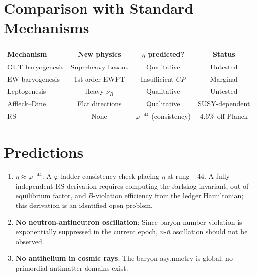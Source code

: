\documentclass[12pt,a4paper]{article}
\theoremstyle{definition}
\theoremstyle{remark}
\begin{document}
\section{Comparison with Standard Mechanisms}
\label{sec:comparison}

\begin{center}
\renewcommand{\arraystretch}{1.3}
\begin{tabular}{@{}lccc@{}}
\toprule
\textbf{Mechanism} & \textbf{New physics} &
\textbf{$\eta$ predicted?} & \textbf{Status} \\
\midrule
GUT baryogenesis & Superheavy bosons & Qualitative & Untested \\
EW baryogenesis & 1st-order EWPT & Insufficient $CP$ & Marginal \\
Leptogenesis & Heavy $\nu_R$ & Qualitative & Untested \\
Affleck--Dine & Flat directions & Qualitative & SUSY-dependent \\
RS & None & $\varphi^{-44}$ (consistency) & $4.6\%$ off Planck \\
\bottomrule
\end{tabular}
\end{center}

\section{Predictions}
\label{sec:predictions}

\begin{enumerate}
  \item \textbf{$\eta \approx \varphi^{-44}$}: A $\varphi$-ladder
  consistency check placing $\eta$ at rung $-44$.  A fully
  independent RS derivation requires computing the Jarlskog invariant,
  out-of-equilibrium factor, and $B$-violation efficiency from the
  ledger Hamiltonian; this derivation is an identified open problem.

  \item \textbf{No neutron-antineutron oscillation}: Since baryon
  number violation is exponentially suppressed in the current epoch,
  $n$-$\bar{n}$ oscillation should not be observed.

  \item \textbf{No antihelium in cosmic rays}: The baryon asymmetry
  is global; no primordial antimatter domains exist.
\end{enumerate}
\end{document}
